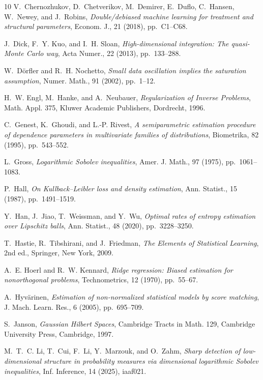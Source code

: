 \begin{thebibliography}{10}
{\sc V.~Chernozhukov, D.~Chetverikov, M.~Demirer, E.~Duflo, C.~Hansen, W.~Newey, and J.~Robins}, {\em Double/debiased machine learning for treatment and structural parameters}, Econom. J., 21 (2018), pp.~C1--C68.

{\sc J.~Dick, F.~Y. Kuo, and I.~H. Sloan}, {\em High-dimensional integration: The quasi-{M}onte {C}arlo way}, Acta Numer., 22 (2013), pp.~133--288.

{\sc W.~D\"orfler and R.~H. Nochetto}, {\em Small data oscillation implies the saturation assumption}, Numer. Math., 91 (2002), pp.~1--12.

{\sc H.~W. Engl, M.~Hanke, and A.~Neubauer}, {\em Regularization of Inverse Problems}, Math. Appl. 375, Kluwer Academic Publishers, Dordrecht, 1996.

{\sc C.~Genest, K.~Ghoudi, and L.-P. Rivest}, {\em A semiparametric estimation procedure of dependence parameters in multivariate families of distributions}, Biometrika, 82 (1995), pp.~543--552.

{\sc L.~Gross}, {\em Logarithmic {S}obolev inequalities}, Amer. J. Math., 97 (1975), pp.~1061--1083.

{\sc P.~Hall}, {\em On {K}ullback--{L}eibler loss and density estimation}, Ann. Statist., 15 (1987), pp.~1491--1519.

{\sc Y.~Han, J.~Jiao, T.~Weissman, and Y.~Wu}, {\em Optimal rates of entropy estimation over {L}ipschitz balls}, Ann. Statist., 48 (2020), pp.~3228--3250.

{\sc T.~Hastie, R.~Tibshirani, and J.~Friedman}, {\em The Elements of Statistical Learning}, 2nd ed., Springer, New York, 2009.

{\sc A.~E. Hoerl and R.~W. Kennard}, {\em Ridge regression: Biased estimation for nonorthogonal problems}, Technometrics, 12 (1970), pp.~55--67.

{\sc A.~Hyv\"arinen}, {\em Estimation of non-normalized statistical models by score matching}, J. Mach. Learn. Res., 6 (2005), pp.~695--709.

{\sc S.~Janson}, {\em Gaussian Hilbert Spaces}, Cambridge Tracts in Math. 129, Cambridge University Press, Cambridge, 1997.

{\sc M.~T.~C. Li, T.~Cui, F.~Li, Y.~Marzouk, and O.~Zahm}, {\em Sharp detection of low-dimensional structure in probability measures via dimensional logarithmic {S}obolev inequalities}, Inf. Inference, 14 (2025), iaaf021.


\end{thebibliography}
